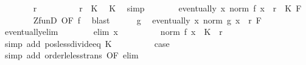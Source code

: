 \begin{isabellebody}
\ \ \ \ \isamarkupfalse%
\ {\isachardoublequoteopen}{}\ {\isacharless}{\kern0pt}\ r{\isachardoublequoteclose}\isanewline
\ \ \ \ \isamarkupfalse%
\ \isamarkupfalse%
\ {\isachardoublequoteopen}{}\ {\isacharless}{\kern0pt}\ r\ {\isacharslash}{\kern0pt}\ K{\isachardoublequoteclose}\ \isamarkupfalse%
\ K\ \isamarkupfalse%
\ simp\isanewline
\ \ \ \ \isamarkupfalse%
\ \isamarkupfalse%
\ {\isachardoublequoteopen}eventually\ {\isacharparenleft}{\kern0pt}{\isasymlambda}x{\isachardot}{\kern0pt}\ norm\ {\isacharparenleft}{\kern0pt}f\ x{\isacharparenright}{\kern0pt}\ {\isacharless}{\kern0pt}\ r\ {\isacharslash}{\kern0pt}\ K{\isacharparenright}{\kern0pt}\ F{\isachardoublequoteclose}\isanewline
\ \ \ \ \ \ \isamarkupfalse%
\ ZfunD\ {\isacharbrackleft}{\kern0pt}OF\ f{\isacharbrackright}{\kern0pt}\ \isamarkupfalse%
\ blast\isanewline
\ \ \ \ \isamarkupfalse%
\ g\ \isamarkupfalse%
\ {\isachardoublequoteopen}eventually\ {\isacharparenleft}{\kern0pt}{\isasymlambda}x{\isachardot}{\kern0pt}\ norm\ {\isacharparenleft}{\kern0pt}g\ x{\isacharparenright}{\kern0pt}\ {\isacharless}{\kern0pt}\ r{\isacharparenright}{\kern0pt}\ F{\isachardoublequoteclose}\isanewline
\ \ \ \ \isamarkupfalse%
\ eventually{\isacharunderscore}{\kern0pt}elim\isanewline
\ \ \ \ \ \ \isamarkupfalse%
\ {\isacharparenleft}{\kern0pt}elim\ x{\isacharparenright}{\kern0pt}\isanewline
\ \ \ \ \ \ \isamarkupfalse%
\ \isamarkupfalse%
\ {\isachardoublequoteopen}norm\ {\isacharparenleft}{\kern0pt}f\ x{\isacharparenright}{\kern0pt}\ {\isacharasterisk}{\kern0pt}\ K\ {\isacharless}{\kern0pt}\ r{\isachardoublequoteclose}\isanewline
\ \ \ \ \ \ \ \ \isamarkupfalse%
\ {\isacharparenleft}{\kern0pt}simp\ add{\isacharcolon}{\kern0pt}\ pos{\isacharunderscore}{\kern0pt}less{\isacharunderscore}{\kern0pt}divide{\isacharunderscore}{\kern0pt}eq\ K{\isacharparenright}{\kern0pt}\isanewline
\ \ \ \ \ \ \isamarkupfalse%
\ \isamarkupfalse%
\ {\isacharquery}{\kern0pt}case\isanewline
\ \ \ \ \ \ \ \ \isamarkupfalse%
\ {\isacharparenleft}{\kern0pt}simp\ add{\isacharcolon}{\kern0pt}\ order{\isacharunderscore}{\kern0pt}le{\isacharunderscore}{\kern0pt}less{\isacharunderscore}{\kern0pt}trans\ {\isacharbrackleft}{\kern0pt}OF\ elim{\isacharparenleft}{\kern0pt}{}{\isacharparenright}{\kern0pt}{\isacharbrackright}{\kern0pt}{\isacharparenright}{\kern0pt}\isanewline

\end{isabellebody}
